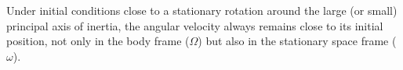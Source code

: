 Under initial conditions close to a stationary rotation around the large (or small) principal axis of inertia, the angular velocity always remains close to its initial position, not only in the body frame ($\Omega$) but also in the stationary space frame ($\omega$).
